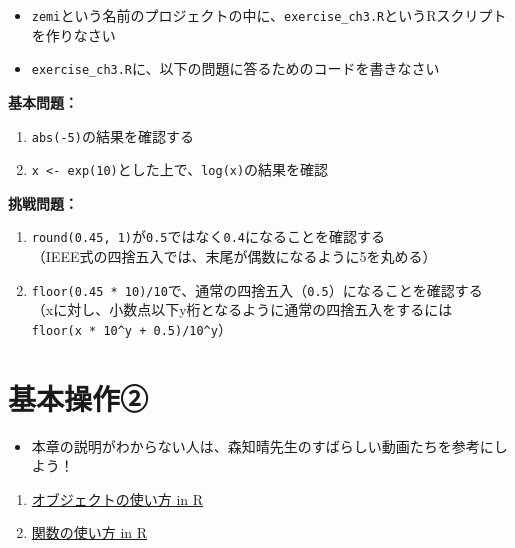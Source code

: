 \documentclass[
]{book}
\providecommand{\tightlist}{%
  \setlength{\itemsep}{0pt}\setlength{\parskip}{0pt}}
\begin{document}
\begin{itemize}
\tightlist
\item
  \texttt{zemi}という名前のプロジェクトの中に、\texttt{exercise\_ch3.R}というRスクリプトを作りなさい
\item
  \texttt{exercise\_ch3.R}に、以下の問題に答るためのコードを書きなさい
\end{itemize}

\textbf{基本問題：}

\begin{enumerate}
\def\labelenumi{\arabic{enumi}.}
\tightlist
\item
  \texttt{abs(-5)}の結果を確認する
\item
  \texttt{x\ \textless{}-\ exp(10)}とした上で、\texttt{log(x)}の結果を確認
\end{enumerate}

\textbf{挑戦問題：}

\begin{enumerate}
\def\labelenumi{\arabic{enumi}.}
\tightlist
\item
  \texttt{round(0.45,\ 1)}が\texttt{0.5}ではなく\texttt{0.4}になることを確認する\\
  （IEEE式の四捨五入では、末尾が偶数になるように5を丸める）
\item
  \texttt{floor(0.45\ *\ 10)/10}で、通常の四捨五入（\texttt{0.5}）になることを確認する\\
  （xに対し、小数点以下y桁となるように通常の四捨五入をするには\texttt{floor(x\ *\ 10\^{}y\ +\ 0.5)/10\^{}y}）
\end{enumerate}

\hypertarget{ux57faux672cux64cdux4f5cux2461}{%
\chapter{基本操作②}\label{ux57faux672cux64cdux4f5cux2461}}

\begin{itemize}
\tightlist
\item
  本章の説明がわからない人は、森知晴先生のすばらしい動画たちを参考にしよう！
\end{itemize}

\begin{enumerate}
\def\labelenumi{\arabic{enumi}.}
\tightlist
\item
  \href{https://youtu.be/CblsIBlzqX0}{オブジェクトの使い方 in R}\\
\item
  \href{https://youtu.be/q8MI6P2hoUM}{関数の使い方 in R}
\end{enumerate}
\end{document}
